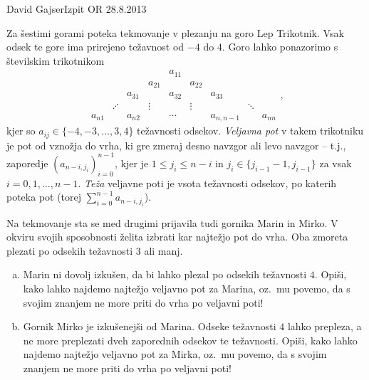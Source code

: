 \begin{naloga}{David Gajser}{Izpit OR 28.8.2013}
\begin{vprasanje}
Za šestimi gorami poteka tekmovanje v plezanju na goro Lep Trikotnik.
Vsak odsek te gore ima prirejeno težavnost od $-4$ do $4$.
Goro lahko ponazorimo s številskim trikotnikom
$$
\begin{array}{ccccccccc}
                &&&& a_{11} \\
            &&& a_{21} && a_{22} \\
        && a_{31} && a_{32} && a_{33} \\
     & \iddots && \vdots && \vdots && \ddots \\
a_{n1} && a_{n2} && \cdots && a_{n,n-1} && a_{nn}
\end{array} ,
$$
kjer so $a_{ij} \in \{-4, -3, \dots, 3, 4\}$ težavnosti odsekov.
{\em Veljavna pot} v takem trikotniku je pot od vznožja do vrha,
ki gre zmeraj desno navzgor ali levo navzgor
-- t.j., zaporedje $(a_{n-i, j_i})_{i=0}^{n-1}$,
kjer je $1 \le j_i \le n-i$ in $j_i \in \{j_{i-1}-1, j_{i-1}\}$
za vsak $i = 0, 1, \dots, n-1$.
{\em Teža} veljavne poti je vsota težavnosti odsekov,
po katerih poteka pot (torej $\sum_{i=0}^{n-1} a_{n-i, j_i}$).

Na tekmovanje sta se med drugimi prijavila tudi gornika Marin in Mirko.
V okviru svojih sposobnosti želita izbrati kar najtežjo pot do vrha.
Oba zmoreta plezati po odsekih težavnosti $3$ ali manj.

\begin{enumerate}[(a)]
\item Marin ni dovolj izkušen, da bi lahko plezal po odsekih težavnosti $4$.
Opiši, kako lahko najdemo najtežjo veljavno pot za Marina,
oz.~mu povemo, da s svojim znanjem ne more priti do vrha po veljavni poti!

\item Gornik Mirko je izkušenejši od Marina.
Odseke težavnosti $4$ lahko prepleza,
a ne more preplezati dveh zaporednih odsekov te težavnosti.
Opiši, kako lahko najdemo najtežjo veljavno pot za Mirka,
oz.~mu povemo, da s svojim znanjem ne more priti do vrha po veljavni poti!
\end{enumerate}
\end{vprasanje}


\end{naloga}
